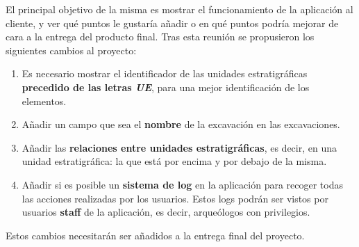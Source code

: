 El principal objetivo de la misma es mostrar el funcionamiento de la aplicación al cliente, y
ver qué puntos le gustaría añadir o en qué puntos podría mejorar de cara a la entrega del
producto final. Tras esta reunión se propusieron los siguientes cambios al proyecto:

    \begin{enumerate}
        \item Es necesario mostrar el identificador de las unidades estratigráficas
        \textbf{precedido de las letras \textit{UE}}, para una mejor identificación de los
        elementos.
        \item Añadir un campo que sea el \textbf{nombre} de la excavación en las
        excavaciones.
        \item Añadir las \textbf{relaciones entre unidades estratigráficas}, es decir, en una
        unidad estratigráfica: la que está por encima y por debajo de la misma.
        \item Añadir si es posible un \textbf{sistema de log} en la aplicación para recoger
        todas las acciones realizadas por los usuarios. Estos logs podrán ser vistos por
        usuarios \textbf{staff} de la aplicación, es decir, arqueólogos con privilegios.
    \end{enumerate}

Estos cambios necesitarán ser añadidos a la entrega final del proyecto.
